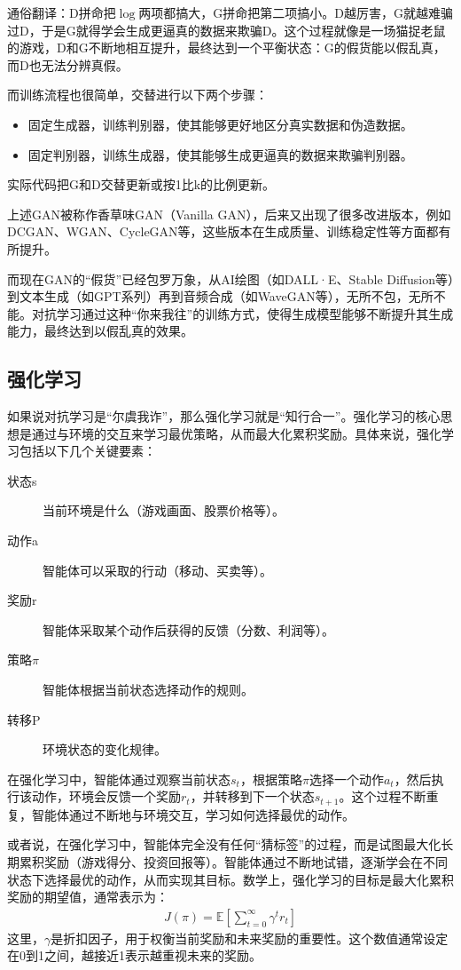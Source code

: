通俗翻译：D拼命把$\log$两项都搞大，G拼命把第二项搞小。D越厉害，G就越难骗过D，于是G就得学会生成更逼真的数据来欺骗D。这个过程就像是一场猫捉老鼠的游戏，D和G不断地相互提升，最终达到一个平衡状态：G的假货能以假乱真，而D也无法分辨真假。

而训练流程也很简单，交替进行以下两个步骤：
\begin{itemize}
    \item 固定生成器，训练判别器，使其能够更好地区分真实数据和伪造数据。
    \item 固定判别器，训练生成器，使其能够生成更逼真的数据来欺骗判别器。
\end{itemize}
实际代码把G和D交替更新或按1比k的比例更新。

上述GAN被称作香草味GAN（Vanilla GAN），后来又出现了很多改进版本，例如DCGAN、WGAN、CycleGAN等，这些版本在生成质量、训练稳定性等方面都有所提升。

而现在GAN的“假货”已经包罗万象，从AI绘图（如DALL·E、Stable Diffusion等）到文本生成（如GPT系列）再到音频合成（如WaveGAN等），无所不包，无所不能。对抗学习通过这种“你来我往”的训练方式，使得生成模型能够不断提升其生成能力，最终达到以假乱真的效果。

\subsection{强化学习}

如果说对抗学习是“尔虞我诈”，那么强化学习就是“知行合一”。强化学习的核心思想是通过与环境的交互来学习最优策略，从而最大化累积奖励。具体来说，强化学习包括以下几个关键要素：
\begin{description}
    \item[状态s] 当前环境是什么（游戏画面、股票价格等）。
    \item[动作a] 智能体可以采取的行动（移动、买卖等）。
    \item[奖励r] 智能体采取某个动作后获得的反馈（分数、利润等）。
    \item[策略$\pi$] 智能体根据当前状态选择动作的规则。
    \item[转移P] 环境状态的变化规律。 
\end{description}

在强化学习中，智能体通过观察当前状态$s_t$，根据策略$\pi$选择一个动作$a_t$，然后执行该动作，环境会反馈一个奖励$r_t$，并转移到下一个状态$s_{t+1}$。这个过程不断重复，智能体通过不断地与环境交互，学习如何选择最优的动作。

或者说，在强化学习中，智能体完全没有任何“猜标签”的过程，而是试图最大化长期累积奖励（游戏得分、投资回报等）。智能体通过不断地试错，逐渐学会在不同状态下选择最优的动作，从而实现其目标。数学上，强化学习的目标是最大化累积奖励的期望值，通常表示为：
\begin{align*}
J(\pi) = \mathbb{E}\left[\sum_{t=0}^{\infty} \gamma^t r_t\right]
\end{align*}
这里，$\gamma$是折扣因子，用于权衡当前奖励和未来奖励的重要性。这个数值通常设定在0到1之间，越接近1表示越重视未来的奖励。


